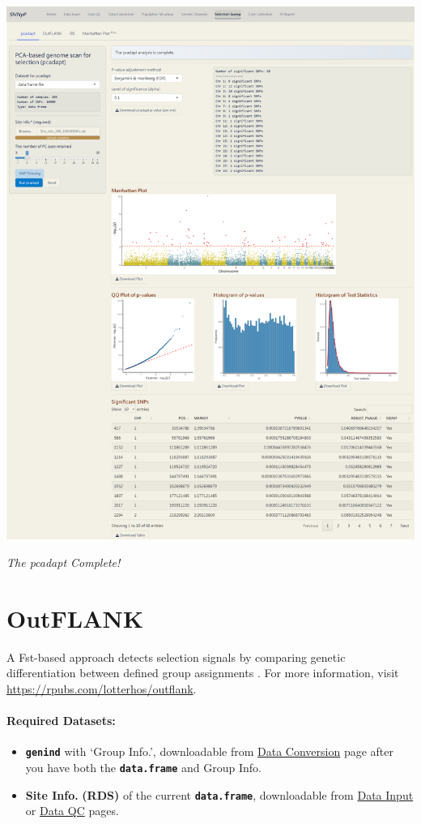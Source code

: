 \documentclass[
]{book}
\providecommand{\tightlist}{%
  \setlength{\itemsep}{0pt}\setlength{\parskip}{0pt}}
\begin{document}
\includegraphics{images/clipboard-1914990218.png}

\emph{The pcadapt Complete!}

\section{OutFLANK}\label{outflank}

A Fst-based approach detects selection signals by comparing genetic differentiation between defined group assignments \citep{whitlock2015}. For more information, visit \url{https://rpubs.com/lotterhos/outflank}.

\paragraph*{Required Datasets:}\label{required-datasets-2}

\begin{itemize}
\tightlist
\item
  {\textbf{\texttt{genind}}} with `Group Info.', downloadable from \ul{Data Conversion} page after you have both the {\textbf{\texttt{data.frame}}} and Group Info.
\item
  \textbf{Site Info.} \textbf{(RDS)} of the current {\textbf{\texttt{data.frame}}}, downloadable from \ul{Data Input} or \ul{Data QC} pages.
\end{itemize}
\end{document}
